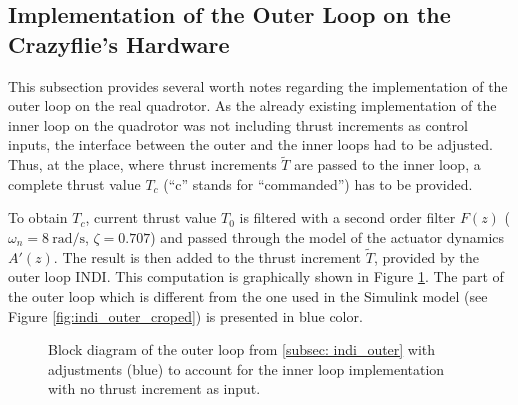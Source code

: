 \documentclass[11pt, a4paper, twoside]{report}
\begin{document}
\subsection{Implementation of the Outer Loop on the Crazyflie's Hardware} \label{subsec:outer_hardware_implementation}

This subsection provides several worth notes regarding the implementation of the outer loop on the real quadrotor. As the already existing implementation of the inner loop on the quadrotor was not including thrust increments as control inputs, the interface between the outer and the inner loops had to be adjusted. Thus, at the place, where thrust increments $\tilde{T}$ are passed to the inner loop, a complete thrust value $T_c$ (``c'' stands for ``commanded'') has to be provided.

To obtain $T_c$, current thrust value $T_0$ is filtered with a second order filter $F(z)$ ($\omega_n=8~\si{\radian/\second}$, $\zeta=0.707$) and passed through the model of the actuator dynamics $A'(z)$. The result is then added to the thrust increment $\tilde{T}$, provided by the outer loop \acrshort{INDI}. This computation is graphically shown in Figure \ref{fig:outer_loop_hw}. The part of the outer loop which is different from the one used in the Simulink model (see Figure \ref{fig:indi_outer_croped}) is presented in blue color. 

\begin{figure}[h]
	\centering 
	\captionsetup{justification=centering, singlelinecheck=off, font=bf, belowskip=-0.5cm}
	\caption[Block diagram of the outer loop with adjustments]{Block diagram of the outer loop from \ref{subsec: indi_outer} with adjustments (blue) to account for the inner loop implementation with no thrust increment as input.}
	\label{fig:outer_loop_hw}
\end{figure}
\end{document}
